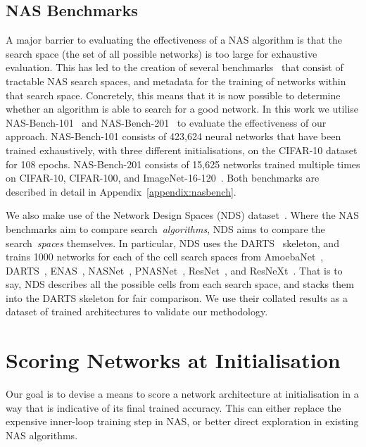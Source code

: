 \documentclass{article}
\begin{document}
\subsection{NAS Benchmarks}
\label{sec:nasbench101}
A major barrier to evaluating the effectiveness of a NAS algorithm is that the search space (the set of all possible networks) is too large for exhaustive evaluation. This has led to the creation of several benchmarks~\citep{ying2019bench,Zela2020NAS-Bench-1Shot1:,Dong2020NAS-Bench-201} that consist of tractable NAS search spaces, and metadata for the training of networks within that search space. Concretely, this means that it is now possible to determine whether an algorithm is able to search for a good network. In this work we utilise NAS-Bench-101~\citep{ying2019bench} and NAS-Bench-201~\citep{Dong2020NAS-Bench-201} to evaluate the effectiveness of our approach. NAS-Bench-101 consists of 423,624 neural networks that have been trained exhaustively, with three different initialisations, on the CIFAR-10 dataset for 108 epochs. NAS-Bench-201 consists of 15,625 networks trained multiple times on CIFAR-10, CIFAR-100, and ImageNet-16-120~\citep{chrabaszcz2017downsampled}. Both benchmarks are described in detail in Appendix~\ref{appendix:nasbench}.

We also make use of the Network Design Spaces (NDS) dataset~\citep{radosavovic2019network}. Where the NAS benchmarks aim to compare search~\textit{algorithms}, NDS aims to compare the search~\textit{spaces} themselves. In particular, NDS uses the DARTS~\citep{liu2019darts} skeleton, and trains 1000 networks for each of the cell search spaces from AmoebaNet~\citep{real2019regularized}, DARTS~\citep{liu2019darts}, ENAS~\citep{pham2018efficient},  NASNet~\citep{zoph2017neural},
PNASNet~\citep{liu2018progressive}, ResNet~\citep{he2016deep}, and ResNeXt~\citep{xie2017aggregated}. That is to say, NDS describes all the possible cells from each search space, and stacks them into the DARTS skeleton for fair comparison. We use their collated results as a dataset of trained architectures to validate our methodology.


\section{Scoring Networks at Initialisation}
\label{sec:scoring}

Our goal is to devise a means to score a network architecture at initialisation in a way that is indicative of its final trained accuracy. This can either replace the expensive inner-loop training step in NAS, or better direct exploration in existing NAS algorithms.
\end{document}
